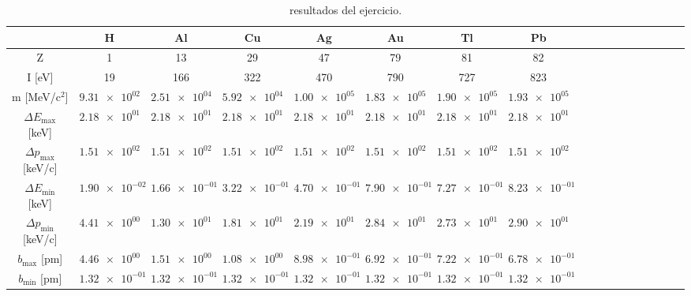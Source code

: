 \begin{table}
\caption{resultados del ejercicio.}
\label{Tab:02-ex03}
\begin{tabular}{cccccccccccccccccc}
\toprule
 & H & Al & Cu & Ag & Au & Tl & Pb \\
\midrule
Z & 1 & 13 & 29 & 47 & 79 & 81 & 82 \\
I [eV] & 19 & 166 & 322 & 470 & 790 & 727 & 823 \\
m [MeV/c$^2$] & $\SI{9.31e+02}{}$ & $\SI{2.51e+04}{}$ & $\SI{5.92e+04}{}$ & $\SI{1.00e+05}{}$ & $\SI{1.83e+05}{}$ & $\SI{1.90e+05}{}$ & $\SI{1.93e+05}{}$ \\
$\Delta E_{\max}$ [keV] & $\SI{2.18e+01}{}$ & $\SI{2.18e+01}{}$ & $\SI{2.18e+01}{}$ & $\SI{2.18e+01}{}$ & $\SI{2.18e+01}{}$ & $\SI{2.18e+01}{}$ & $\SI{2.18e+01}{}$ \\
$\Delta p_{\max}$ [keV/c] & $\SI{1.51e+02}{}$ & $\SI{1.51e+02}{}$ & $\SI{1.51e+02}{}$ & $\SI{1.51e+02}{}$ & $\SI{1.51e+02}{}$ & $\SI{1.51e+02}{}$ & $\SI{1.51e+02}{}$ \\
$\Delta E_{\min}$ [keV] & $\SI{1.90e-02}{}$ & $\SI{1.66e-01}{}$ & $\SI{3.22e-01}{}$ & $\SI{4.70e-01}{}$ & $\SI{7.90e-01}{}$ & $\SI{7.27e-01}{}$ & $\SI{8.23e-01}{}$ \\
$\Delta p_{\min}$ [keV/c] & $\SI{4.41e+00}{}$ & $\SI{1.30e+01}{}$ & $\SI{1.81e+01}{}$ & $\SI{2.19e+01}{}$ & $\SI{2.84e+01}{}$ & $\SI{2.73e+01}{}$ & $\SI{2.90e+01}{}$ \\
$b_{\max}$ [pm] & $\SI{4.46e+00}{}$ & $\SI{1.51e+00}{}$ & $\SI{1.08e+00}{}$ & $\SI{8.98e-01}{}$ & $\SI{6.92e-01}{}$ & $\SI{7.22e-01}{}$ & $\SI{6.78e-01}{}$ \\
$b_{\min}$ [pm] & $\SI{1.32e-01}{}$ & $\SI{1.32e-01}{}$ & $\SI{1.32e-01}{}$ & $\SI{1.32e-01}{}$ & $\SI{1.32e-01}{}$ & $\SI{1.32e-01}{}$ & $\SI{1.32e-01}{}$ \\
\bottomrule
\end{tabular}
\end{table}
